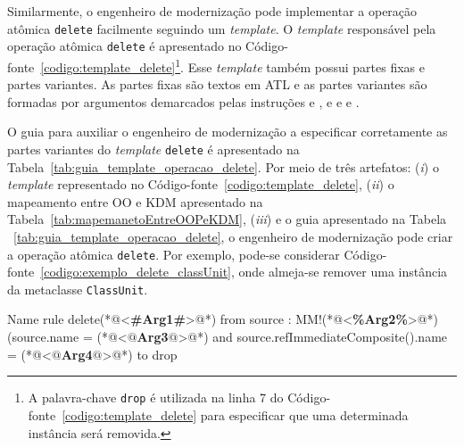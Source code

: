 Similarmente, o engenheiro de modernização pode implementar a operação atômica \texttt{delete} facilmente seguindo um \textit{template}. O \textit{template} responsável pela operação atômica \texttt{delete} é apresentado no Código-fonte~\ref{codigo:template_delete}\footnote{A palavra-chave \texttt{drop} é utilizada na linha 7 do Código-fonte~\ref{codigo:template_delete} para especificar que uma determinada instância será removida.}. Esse \textit{template} também possui partes fixas e partes variantes. As partes fixas são textos em ATL e as partes variantes são formadas por argumentos demarcados pelas instruções \aspas{\textbf{<\#}} e \aspas{\textbf{\#>}}, \aspas{\textbf{<\%}} e \aspas{\textbf{\%>}} e  e . 

O guia para auxiliar o engenheiro de modernização a especificar corretamente as partes variantes do \textit{template} \texttt{delete} é apresentado na Tabela~\ref{tab:guia_template_operacao_delete}. Por meio de três artefatos: (\textit{i}) o \textit{template} representado no Código-fonte~\ref{codigo:template_delete}, (\textit{ii}) o mapeamento entre OO e KDM apresentado na Tabela~\ref{tab:mapemanetoEntreOOPeKDM}, (\textit{iii}) e o guia apresentado na Tabela ~\ref{tab:guia_template_operacao_delete}, o engenheiro de modernização pode criar a operação atômica \texttt{delete}. Por exemplo, pode-se considerar Código-fonte~\ref{codigo:exemplo_delete_classUnit}, onde almeja-se remover uma instância da metaclasse \texttt{ClassUnit}. 

\begin{codigo}[caption={[\textit{Template} ATL para realizar a operação atômica \texttt{delete}.] \textit{Template} ATL para realizar a operação atômica \texttt{delete}.},escapeinside={(*@}{@*)}, basicstyle=\footnotesize, label={codigo:template_delete}, language=ATL]{Name}
rule delete(*@<\textbf{\#Arg1\#}>@*) {
  from
      source : MM!(*@<\textbf{\%Arg2\%}>@*) (source.name = (*@<\textbf{$@$Arg3$@$}>@*) and source.refImmediateComposite().name = (*@<\textbf{$@$Arg4$@$}>@*)
  to
      drop
}
\end{codigo}

